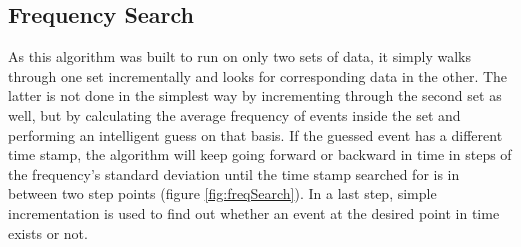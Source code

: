       \subsection{Frequency Search}
      \label{ch:Analysis software:sec:Search algorithms:subsec:Frequency Search}
      As this algorithm was built to run on only two sets of data, it simply walks through one set incrementally and looks for corresponding data in the other. The latter is not done in the simplest way by incrementing through the second set as well, but by calculating the average frequency of events inside the set and performing an intelligent guess on that basis. If the guessed event has a different time stamp, the algorithm will keep going forward or backward in time in steps of the frequency's standard deviation until the time stamp searched for is in between two step points (figure \ref{fig:freqSearch}). In a last step, simple incrementation is used to find out whether an event at the desired point in time exists or not.
